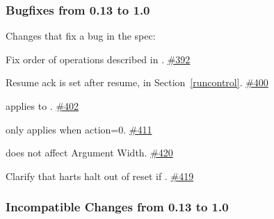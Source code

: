 \newcommand{\PR}[1]{\href{https://github.com/riscv/riscv-debug-spec/pull/#1}{\##1}}

\subsubsection{Bugfixes from 0.13 to 1.0}

\begin{steps}{Changes that fix a bug in the spec:}
    \item Fix order of operations described in \RdmSbdataZero. \PR{392}
    \item Resume ack is set after resume, in Section~\ref{runcontrol}. \PR{400}
    \item \FcsrTextraThirtytwoSselect applies to \FcsrTextraThirtytwoSvalue. \PR{402}
    \item \FcsrTcontrolMte only applies when action=0. \PR{411}
    \item \FacAccessmemoryAamsize does not affect Argument Width. \PR{420}
    \item Clarify that harts halt out of reset if . \PR{419}
\end{steps}

\subsubsection{Incompatible Changes from 0.13 to 1.0}

